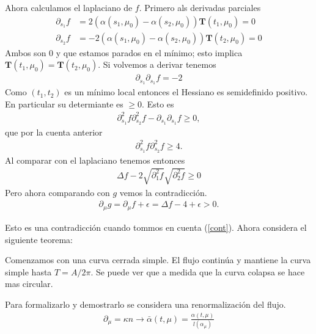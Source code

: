 \documentclass{article}
\theoremstyle{mytheoremstyle}
\theoremstyle{mytheoremstyle}
\theoremstyle{myproblemstyle}
\begin{document}
      Ahora calculamos el laplaciano de $f$. Primero als derivadas parciales
      \begin{align}
        \partial_{s_1} f &= 2(\alpha(s_1,\mu_0)-\alpha(s_2,\mu_0))\bm{T}(t_1,\mu_0) =0 \\
        \partial_{s_2} f &= -2(\alpha(s_1,\mu_0)-\alpha(s_2,\mu_0))\bm{T}(t_2,\mu_0)=0 
      \end{align}
      Ambos son $0$ y que estamos parados en el mínimo; esto implica $\bm{T}(t_1,\mu_0)=\bm{T}(t_2,\mu_0)$. Si volvemos a derivar tenemos 
      \begin{align}
        \partial_{s_1}\partial_{s_1}f=-2
      \end{align}
      Como $(t_1,t_2)$ es un mínimo local entonces el Hessiano es semidefinido positivo. En particular su determiante es $\geq 0$. Esto es 
      \begin{align}
        \partial_{s_1}^2 f \partial_{s_2}^2 f - \partial_{s_1}\partial_{s_1}f\geq 0,
      \end{align}
      que por la cuenta anterior 
      \begin{align}
        \partial_{s_1}^2 f \partial_{s_2}^2 f \geq 4.
      \end{align}
      Al comparar con el laplaciano tenemos entonces
      \begin{align}
        \Delta f - 2\sqrt{\partial_1^2 f}\sqrt{\partial_2^2f}\geq 0
      \end{align}
      Pero ahora comparando con $g$ vemos la contradicción.
      \begin{align}
        \partial_\mu g = \partial_\mu f + \epsilon = \Delta f - 4 + \epsilon > 0.
      \end{align}

      Esto es una contradicción cuando tommos en cuenta (\ref{cont}). 
      Ahora considera el siguiente teorema:

      \begin{theorem}[]
        Comenzamos con una curva cerrada simple. El flujo continúa y mantiene la curva simple hasta $T=A/2\pi$. Se puede ver que a medida que la curva colapsa se hace mas circular.
      \end{theorem}
      Para formalizarlo y demostrarlo se considera una renormalización del flujo.
      \begin{align}
        \partial_\mu = \kappa n \longrightarrow \bar{\alpha}(t,\mu) = \frac{\alpha(t,\mu)}{l(\alpha_\mu)}
      \end{align}
\end{document}
